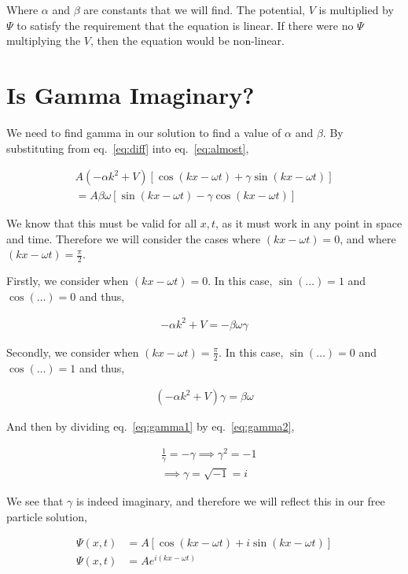 \documentclass[11pt]{amsart}
\begin{document}
Where $\alpha$ and $\beta$ are constants that we will find. The potential, $V$ is multiplied by $\Psi$ to satisfy the requirement that the equation is linear. If there were no $\Psi$ multiplying the $V$, then the equation would be non-linear.

\section{Is Gamma Imaginary?}

We need to find gamma in our solution to find a value of $\alpha$ and $\beta$. By substituting from eq.~\ref{eq:diff} into eq.~\ref{eq:almost},

\begin{align*}
A\left(-\alpha k^2 + V\right) \left[\cos(kx - \omega t) + \gamma \sin(kx - \omega t)\right] \\
= A\beta\omega\left[\sin(kx - \omega t) - \gamma \cos(kx - \omega t)\right]
\end{align*}

We know that this must be valid for all $x, t$, as it must work in any point in space and time. Therefore we will consider the cases where $(kx - \omega t) = 0$, and where $(kx - \omega t) = \frac{\pi}{2}$.

Firstly, we consider when $(kx - \omega t) = 0$. In this case, $\sin(\dots) = 1$ and $\cos(\dots) = 0$ and thus,

\begin{align}
\label{eq:gamma1}
-\alpha k^2 + V = -\beta \omega \gamma
\end{align}

Secondly, we consider when $(kx - \omega t) = \frac{\pi}{2}$. In this case, $\sin(\dots) = 0$ and $\cos(\dots) = 1$ and thus,

\begin{align}
\label{eq:gamma2}
(-\alpha k^2 + V) \gamma = \beta \omega
\end{align}

And then by dividing eq.~\ref{eq:gamma1} by eq.~\ref{eq:gamma2},

\begin{align*}
  &\frac{1}{\gamma} = -\gamma \implies \gamma^2 = -1 \\
  &\implies \gamma = \sqrt{-1} = i
\end{align*}

We see that $\gamma$ is indeed imaginary, and therefore we will reflect this in our free particle solution,

\begin{align*}
\Psi(x, t) &= A\left[\cos(kx - \omega t) + i\sin(kx - \omega t)\right] \\
\Psi(x, t) &= A e^{i(kx - \omega t)}
\end{align*}
\end{document}
